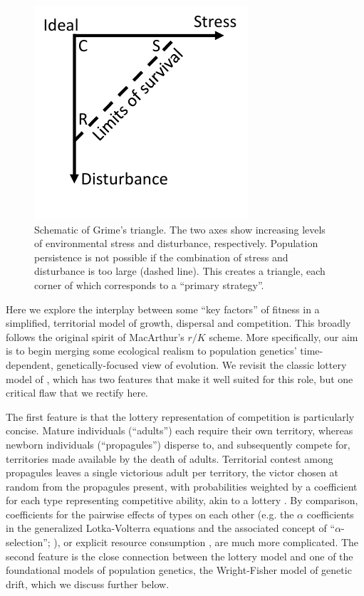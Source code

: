 \documentclass[11pt]{article}
\begin{document}
\begin{figure}
\centering
\includegraphics[scale=1]{grimeschematic.pdf}
\caption{\label{fig:grimeschematic} Schematic of Grime's triangle. The two axes show increasing levels of environmental stress and disturbance, respectively. Population persistence is not possible if the combination of stress and disturbance is too large (dashed line). This creates a triangle, each corner of which corresponds to a ``primary strategy''.} 
\end{figure}

Here we explore the interplay between some ``key factors'' of fitness in a simplified, territorial model of growth, dispersal and competition. This broadly follows the original spirit of MacArthur's $r/K$ scheme. More specifically, our aim is to begin merging some ecological realism to population genetics' time-dependent, genetically-focused view of evolution. We revisit the classic lottery model of \cite{chesson_1981}, which has two features that make it well suited for this role, but one critical flaw that we rectify here.

The first feature is that the lottery representation of competition is  particularly concise. Mature individuals (``adults'') each require their own territory, whereas newborn individuals (``propagules'') disperse to, and subsequently compete for, territories made available by the death of adults. Territorial contest among propagules leaves a single victorious adult per territory, the victor chosen at random from the propagules present, with probabilities weighted by a coefficient for each type representing competitive ability, akin to a lottery \citep{sale_77}. By comparison, coefficients for the pairwise effects of types on each other (e.g. the $\alpha$ coefficients in the generalized Lotka-Volterra equations and the associated concept of ``$\alpha$-selection''; \citealt{gill_1974,case_1974,joshi_2001}), or  explicit resource consumption \citep{tilman_1982}, are much more complicated. The second feature is the close connection between the lottery model and one of the foundational models of population genetics, the Wright-Fisher model of genetic drift, which we discuss further below. 
\end{document}
